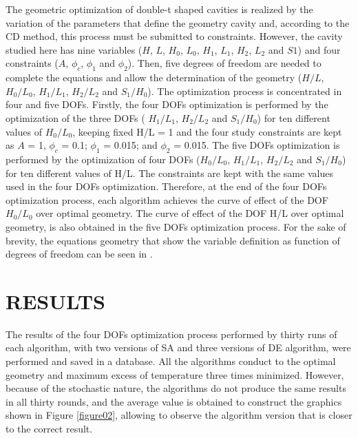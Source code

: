 \documentclass[12pt,fleqn]{article}
\begin{document}
The geometric optimization of double-t shaped cavities is realized by the variation of the parameters that define the geometry cavity and, according to the CD method, this process must be submitted to constraints. However, the cavity studied here has nine variables ($H$, $L$, $H_{0}$, $L_{0}$, $H_{1}$, $L_{1}$, $H_{2}$, $L_{2}$ and $S1$) and four constraints ($A$, $\phi_{c}$, $\phi_{1}$ and $\phi_{2}$). Then, five degrees of freedom are needed to complete the equations and allow the determination of the geometry ($H/L$, $H_{0}/L_{0}$, $H_{1}/L_{1}$, $H_{2}/L_{2}$ and $S_{1}/H_{0}$). The optimization process is concentrated in four and five DOFs. Firstly, the four DOFs optimization is performed by the optimization of the three DOFs ( $H_{1}/L_{1}$, $H_{2}/L_{2}$ and $S_{1}/H_{0}$) for ten different values of $H_{0}/L_{0}$,  keeping fixed  H/L = 1 and the four study constraints are kept as $A$ = 1, $\phi_{c}$ = 0.1; $\phi_{1}$ = 0.015; and $\phi_{2}$ = 0.015. The five DOFs optimization is performed by the optimization of four DOFs ($H_{0}/L_{0}$, $H_{1}/L_{1}$, $H_{2}/L_{2}$ and $S_{1}/H_{0}$) for ten different values of H/L.  The constraints are kept with the same values used in the four  DOFs optimization. Therefore, at the end of the four  DOFs optimization process, each algorithm achieves the curve of effect of the DOF  $H_{0}/L_{0}$ over optimal geometry. The curve of effect of the DOF H/L over optimal geometry, is also obtained in the five DOFs optimization process. For the sake of brevity, the equations geometry that show the variable definition as function of degrees of freedom can be seen in \cite{Gonzales2015b}.

\section{RESULTS}

The results of the four DOFs optimization process performed by thirty runs of each algorithm, with two versions of SA and three versions of DE algorithm, were performed and saved in a database. All the algorithms conduct to the optimal geometry and maximum excess of temperature three times minimized. However, because of the stochastic nature, the algorithms do not produce the same results in all thirty rounds, and the average value is obtained to construct the graphics shown in Figure \ref{figure02}, allowing to observe the algorithm version that is closer to the correct result.
\end{document}
